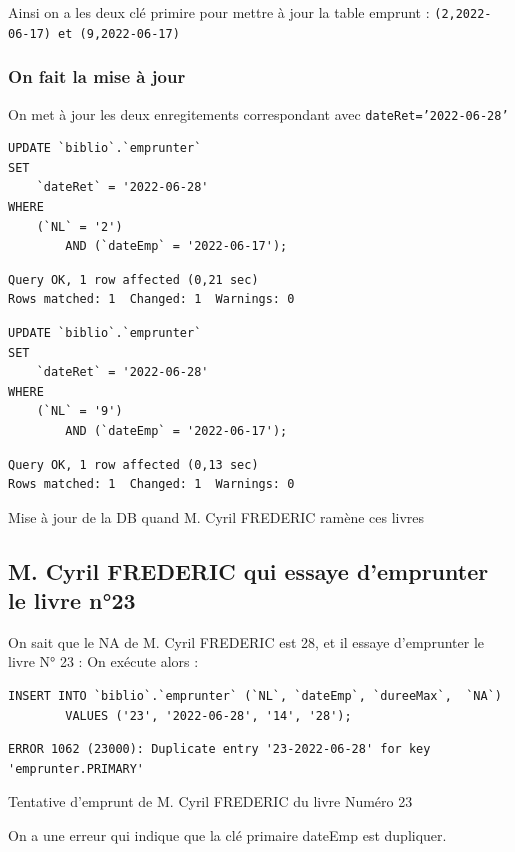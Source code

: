 \documentclass{article}
\begin{document}
Ainsi on a les deux clé primire pour mettre à jour la table emprunt : \texttt{(2,2022-06-17) et (9,2022-06-17)}
\subsubsection{On fait la mise à jour}
On met à jour les deux enregitements correspondant avec \texttt{dateRet='2022-06-28'}
\begin{listing}[H]
\begin{minipage}{0.498765\linewidth}
\begin{verbatim}
UPDATE `biblio`.`emprunter` 
SET 
	`dateRet` = '2022-06-28'
WHERE
	(`NL` = '2')
		AND (`dateEmp` = '2022-06-17');
\end{verbatim}
\begin{verbatim}
Query OK, 1 row affected (0,21 sec)
Rows matched: 1  Changed: 1  Warnings: 0
\end{verbatim}
\end{minipage}
\begin{minipage}{0.498765\linewidth}
\begin{verbatim}
UPDATE `biblio`.`emprunter` 
SET 
	`dateRet` = '2022-06-28'
WHERE
	(`NL` = '9')
		AND (`dateEmp` = '2022-06-17');
\end{verbatim}

\begin{verbatim}
Query OK, 1 row affected (0,13 sec)
Rows matched: 1  Changed: 1  Warnings: 0
\end{verbatim}
\end{minipage}
\caption{Mise à jour de la DB quand M. Cyril FREDERIC ramène ces livres}
\end{listing}


\subsection{M. Cyril FREDERIC qui essaye d’emprunter le livre n°23}
On sait que le NA de M. Cyril FREDERIC est 28, et il  essaye d'emprunter le livre N° 23 :
On exécute alors :
\begin{listing}[H]
	\begin{verbatim}
INSERT INTO `biblio`.`emprunter` (`NL`, `dateEmp`, `dureeMax`,  `NA`) 
		VALUES ('23', '2022-06-28', '14', '28');
\end{verbatim}
	\begin{verbatim}
ERROR 1062 (23000): Duplicate entry '23-2022-06-28' for key 'emprunter.PRIMARY'
\end{verbatim}
	\caption{Tentative d'emprunt de M. Cyril FREDERIC du livre Numéro 23}
\end{listing}
On a une erreur qui indique que la  clé primaire dateEmp est dupliquer.
\end{document}
